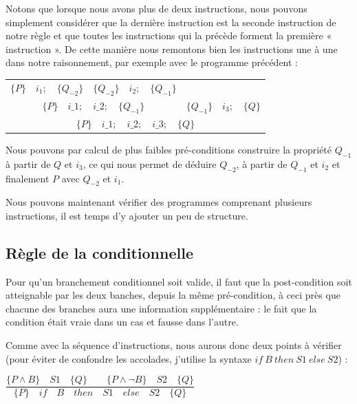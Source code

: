 \documentclass[12pt,francais,]{scrbook}
\begin{document}
Notons que lorsque nous avons plus de deux instructions, nous pouvons
simplement considérer que la dernière instruction est la seconde
instruction de notre règle et que toutes les instructions qui la précède
forment la première « instruction ». De cette manière nous remontons
bien les instructions une à une dans notre raisonnement, par exemple
avec le programme précédent :

\begin{center}
\begin{tabular}{ccc}
  $\{P\}\quad i_1 ; \quad \{Q_{-2}\}$ & $\{Q_{-2}\}\quad i_2 ; \quad \{Q_{-1}\}$ & \\
  \cline{1-2}
  \multicolumn{2}{c}{$\{P\}\quad i\_1 ; \quad i\_2 ; \quad \{Q_{-1}\}$} & $\{Q_{-1}\} \quad i_3 ; \quad \{Q\}$\\
  \hline
  \multicolumn{3}{c}{$\{P\}\quad i\_1 ; \quad i\_2 ; \quad i\_3; \quad \{ Q \}$}
\end{tabular}
\end{center}

Nous pouvons par calcul de plus faibles pré-conditions construire la
propriété \(Q_{-1}\) à partir de \(Q\) et \(i_3\), ce qui nous permet de
déduire \(Q_{-2}\), à partir de \(Q_{-1}\) et \(i_2\) et finalement
\(P\) avec \(Q_{-2}\) et \(i_1\).

Nous pouvons maintenant vérifier des programmes comprenant plusieurs
instructions, il est temps d'y ajouter un peu de structure.

\subsection{Règle de la
conditionnelle}\label{ruxe8gle-de-la-conditionnelle}

Pour qu'un branchement conditionnel soit valide, il faut que la
post-condition soit atteignable par les deux banches, depuis la même
pré-condition, à ceci près que chacune des branches aura une information
supplémentaire : le fait que la condition était vraie dans un cas et
fausse dans l'autre.

Comme avec la séquence d'instructions, nous aurons donc deux points à
vérifier (pour éviter de confondre les accolades, j'utilise la syntaxe
\(if\ B\ then\ S1\ else\ S2\)) :

\begin{center}
\(\dfrac{\{P \wedge B\}\quad S1\quad \{Q\} \quad \quad \{P \wedge \neg B\}\quad S2\quad \{Q\}}{\{P\}\quad if\quad B\quad then\quad S1\quad else\quad S2 \quad \{Q\}}\)
\end{center}
\end{document}
